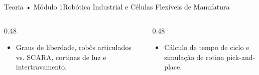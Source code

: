 \begin{senaiframe}{Teoria • Módulo 1}{Robótica Industrial e Células Flexíveis de Manufatura}
  \begin{columns}[t]
    \begin{column}{0.48\textwidth}
      \begin{tcolorbox}[senaibluecard, title={Fundamentos Teóricos}]
        \begin{itemize}
          \item Graus de liberdade, robôs articulados vs. SCARA, cortinas de luz e intertravamento.
        \end{itemize}
      \end{tcolorbox}
    \end{column}
    \begin{column}{0.48\textwidth}
      \begin{tcolorbox}[senaigreencard, title={Prática \& Laboratório}]
        \begin{itemize}
          \item Cálculo de tempo de ciclo e simulação de rotina pick-and-place.
        \end{itemize}
      \end{tcolorbox}
    \end{column}
  \end{columns}
\end{senaiframe}
